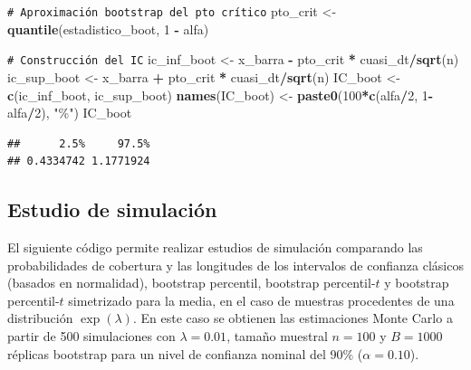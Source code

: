 \documentclass[
]{book}
\newenvironment{Shaded}{\begin{snugshade}}{\end{snugshade}}
\newcommand{\CommentTok}[1]{\textcolor[rgb]{0.56,0.35,0.01}{\textit{#1}}}
\newcommand{\DecValTok}[1]{\textcolor[rgb]{0.00,0.00,0.81}{#1}}
\newcommand{\FunctionTok}[1]{\textcolor[rgb]{0.13,0.29,0.53}{\textbf{#1}}}
\newcommand{\NormalTok}[1]{#1}
\newcommand{\OtherTok}[1]{\textcolor[rgb]{0.56,0.35,0.01}{#1}}
\newcommand{\SpecialCharTok}[1]{\textcolor[rgb]{0.81,0.36,0.00}{\textbf{#1}}}
\newcommand{\StringTok}[1]{\textcolor[rgb]{0.31,0.60,0.02}{#1}}
\theoremstyle{break}
\theoremstyle{nonumberplain}
\renewcommand{\CommentTok}[1]{\textcolor[rgb]{0.41,0.41,0.41}{\texttt{#1}}}
\begin{document}
\begin{Shaded}
\begin{Highlighting}[]
\CommentTok{\# Aproximación bootstrap del pto crítico}
\NormalTok{pto\_crit }\OtherTok{\textless{}{-}} \FunctionTok{quantile}\NormalTok{(estadistico\_boot, }\DecValTok{1} \SpecialCharTok{{-}}\NormalTok{ alfa)}

\CommentTok{\# Construcción del IC}
\NormalTok{ic\_inf\_boot }\OtherTok{\textless{}{-}}\NormalTok{ x\_barra }\SpecialCharTok{{-}}\NormalTok{ pto\_crit }\SpecialCharTok{*}\NormalTok{ cuasi\_dt}\SpecialCharTok{/}\FunctionTok{sqrt}\NormalTok{(n)}
\NormalTok{ic\_sup\_boot }\OtherTok{\textless{}{-}}\NormalTok{ x\_barra }\SpecialCharTok{+}\NormalTok{ pto\_crit }\SpecialCharTok{*}\NormalTok{ cuasi\_dt}\SpecialCharTok{/}\FunctionTok{sqrt}\NormalTok{(n)}
\NormalTok{IC\_boot }\OtherTok{\textless{}{-}} \FunctionTok{c}\NormalTok{(ic\_inf\_boot, ic\_sup\_boot)}
\FunctionTok{names}\NormalTok{(IC\_boot) }\OtherTok{\textless{}{-}} \FunctionTok{paste0}\NormalTok{(}\DecValTok{100}\SpecialCharTok{*}\FunctionTok{c}\NormalTok{(alfa}\SpecialCharTok{/}\DecValTok{2}\NormalTok{, }\DecValTok{1}\SpecialCharTok{{-}}\NormalTok{alfa}\SpecialCharTok{/}\DecValTok{2}\NormalTok{), }\StringTok{"\%"}\NormalTok{)}
\NormalTok{IC\_boot}
\end{Highlighting}
\end{Shaded}

\begin{verbatim}
##      2.5%     97.5% 
## 0.4334742 1.1771924
\end{verbatim}

\subsection{Estudio de simulación}\label{estudio-sim-exp}

El siguiente código permite realizar estudios de
simulación comparando las probabilidades de cobertura y las longitudes
de los intervalos de confianza clásicos (basados en normalidad),
bootstrap percentil, bootstrap percentil-\(t\) y bootstrap percentil-\(t\)
simetrizado para la media, en el caso de muestras procedentes de una
distribución \(\exp \left( \lambda \right)\).
En este caso se obtienen las estimaciones Monte Carlo a partir de 500
simulaciones con \(\lambda = 0.01\), tamaño muestral \(n=100\) y \(B=1000\) réplicas
bootstrap para un nivel de confianza nominal del 90\% (\(\alpha =0.10\)).
\end{document}
